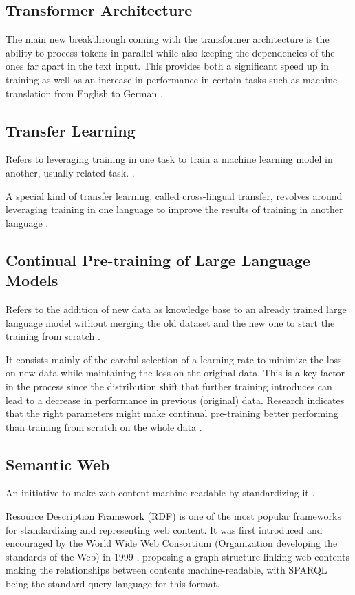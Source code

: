 \subsection{Transformer Architecture}


The main new breakthrough coming with the transformer architecture is the ability to process tokens in parallel while also keeping the dependencies of the ones far apart in the text input. This provides both a significant speed up in training as well as an increase in performance in certain tasks such as machine translation from English to German \cite{vaswani2017attention}.

\subsection{Transfer Learning}

Refers to leveraging training in one task to train a machine learning model in another, usually related task. \cite{torrey2010transfer}. 

A special kind of transfer learning, called cross-lingual transfer, revolves around leveraging training in one language to improve the results of training in another language \cite{cross_lingual_transfer}.

\subsection{Continual Pre-training of Large Language Models}
Refers to the addition of new data as knowledge base to an already trained large language model without merging the old dataset and the new one to start the training from scratch \cite{gupta2023continual}.

It consists mainly of the careful selection of a learning rate to minimize the loss on new data while maintaining the loss on the original data. This is a key factor in the process since the distribution shift that further training introduces can lead to a decrease in performance in previous (original) data. Research indicates that the right parameters might make continual pre-training better performing than training from scratch on the whole data \cite{gupta2023continual}.


\subsection{Semantic Web}

An initiative to make web content machine-readable by standardizing it \cite{pellegrini2006semantic}.

Resource Description Framework (RDF) is one of the most popular frameworks for standardizing and representing web content. It was first introduced and encouraged by the World Wide Web Consortium (Organization developing the standards of the Web) in 1999 \cite{dataeuropa_rdf_sparql}, proposing a graph structure linking web contents making the relationships between contents machine-readable, with SPARQL being the standard query language for this format.